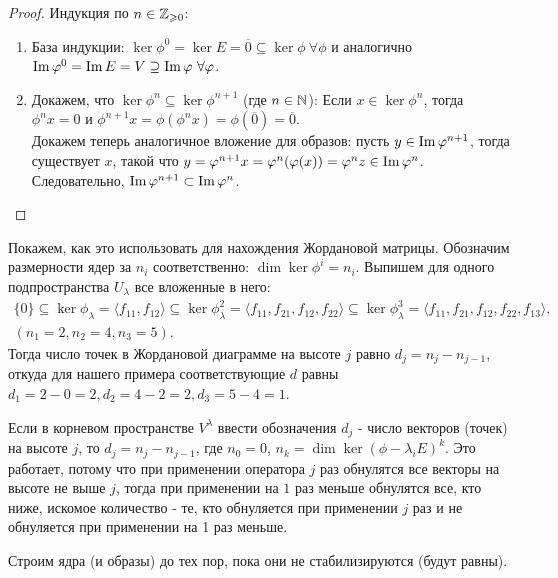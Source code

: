 \begin{proof}
    Индукция по $n \in \mathbb{Z}_{\geqslant 0}$:

    \begin{enumerate}
        \item База индукции: $\ker \phi^0 = \ker E = {\overline{0}} \subseteq \ker \phi \ \forall \phi$ и аналогично $\operatorname{Im} \varphi^0 = \operatorname{Im} E = V \supseteq \operatorname{Im} \varphi \ \forall \varphi$.
        \item Докажем, что $\ker \phi^n \subseteq \ker \phi^{n+1}$ (где $n \in \mathbb{N}$):
        Если $x \in \ker \phi^n$, тогда $\phi^n x = 0$ и $\phi ^{n + 1} x = \phi (\phi ^ n x) = \phi (\overline{0}) = \overline{0}$. \\
        Докажем теперь аналогичное вложение для образов: пусть $y \in \operatorname{Im} \varphi^{n + 1}$, тогда существует $x$, такой что $y = \varphi^{n + 1} x = \varphi^n(\varphi(x)) = \varphi^n z \in \operatorname{Im} \varphi^n$. Следовательно, $\operatorname{Im} \varphi^{n + 1} \subset \operatorname{Im} \varphi^n$.
    \end{enumerate}
\end{proof}

\begin{algorithm}

    Покажем, как это использовать для нахождения Жордановой матрицы. Обозначим размерности ядер за $n_i$ соответственно: $\dim \ker \phi^i = n_i$. Выпишем для одного подпространства $U_{\lambda}$ все вложенные в него:
    \begin{eqnarray}  
        \{0\} \subseteq \ker \phi_{\lambda} = \langle f_{11}, f_{12}\rangle \subseteq \ker \phi_{\lambda}^2 
        = \langle f_{11}, f_{21}, f_{12}, f_{22} \rangle \subseteq \ker \phi_{\lambda}^3 = 
        \langle f_{11}, f_{21}, f_{12}, f_{22}, f_{13} \rangle, \\ (n_1 = 2, n_2 = 4, n_3 = 5).
    \end{eqnarray}
    Тогда число точек в Жордановой диаграмме на высоте $j$ равно $d_j = n_j - n_{j-1}$, откуда для нашего примера соответствующие $d$ равны $d_1 = 2-0=2, d_2 = 4-2=2, d_3 = 5-4=1$.
    
    Если в корневом пространстве $V^{\lambda}$ ввести обозначения $d_j$ - число векторов (точек) на высоте $j$, то $d_j = n_j - n_{j-1}$, где $n_0 = 0$, $n_k = \dim \ker (\phi - \lambda_i E)^k$.
    Это работает, потому что при применении оператора $j$ раз обнулятся все векторы на высоте не выше $j$, 
    тогда при применении на $1$ раз меньше обнулятся все, кто ниже, искомое количество - те, кто обнуляется при применении $j$ раз и не обнуляется при применении на 1 раз меньше.
    
    Строим ядра (и образы) до тех пор, пока они не стабилизируются (будут равны).
\end{algorithm}

